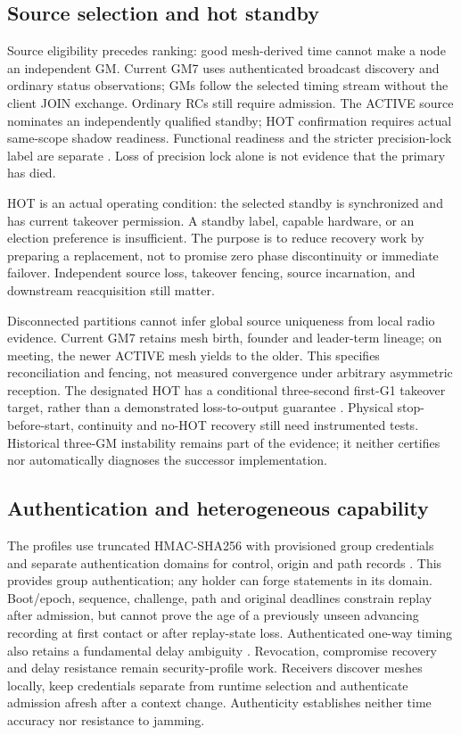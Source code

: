 \documentclass[11pt,letterpaper]{article}
\begin{document}
\subsection{Source selection and hot standby}
Source eligibility precedes ranking: good mesh-derived time cannot make a node an independent GM. Current GM7 uses authenticated broadcast discovery and ordinary status observations; GMs follow the selected timing stream without the client JOIN exchange. Ordinary RCs still require admission. The ACTIVE source nominates an independently qualified standby; HOT confirmation requires actual same-scope shadow readiness. Functional readiness and the stricter precision-lock label are separate \cite{current}. Loss of precision lock alone is not evidence that the primary has died.

HOT is an actual operating condition: the selected standby is synchronized and has current takeover permission. A standby label, capable hardware, or an election preference is insufficient. The purpose is to reduce recovery work by preparing a replacement, not to promise zero phase discontinuity or immediate failover. Independent source loss, takeover fencing, source incarnation, and downstream reacquisition still matter.

Disconnected partitions cannot infer global source uniqueness from local radio evidence. Current GM7 retains mesh birth, founder and leader-term lineage; on meeting, the newer ACTIVE mesh yields to the older. This specifies reconciliation and fencing, not measured convergence under arbitrary asymmetric reception. The designated HOT has a conditional three-second first-G1 takeover target, rather than a demonstrated loss-to-output guarantee \cite{current}. Physical stop-before-start, continuity and no-HOT recovery still need instrumented tests. Historical three-GM instability remains part of the evidence; it neither certifies nor automatically diagnoses the successor implementation.

\subsection{Authentication and heterogeneous capability}
The profiles use truncated HMAC-SHA256 with provisioned group credentials and separate authentication domains for control, origin and path records \cite{v14,current}. This provides group authentication; any holder can forge statements in its domain. Boot/epoch, sequence, challenge, path and original deadlines constrain replay after admission, but cannot prove the age of a previously unseen advancing recording at first contact or after replay-state loss. Authenticated one-way timing also retains a fundamental delay ambiguity \cite{delaysecurity}. Revocation, compromise recovery and delay resistance remain security-profile work. Receivers discover meshes locally, keep credentials separate from runtime selection and authenticate admission afresh after a context change. Authenticity establishes neither time accuracy nor resistance to jamming.
\end{document}
